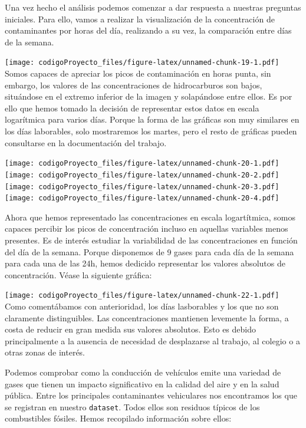 \documentclass[
]{article}
\begin{document}
Una vez hecho el análisis podemos comenzar a dar respuesta a nuestras
preguntas iniciales. Para ello, vamos a realizar la visualización de la
concentración de contaminantes por horas del día, realizando a su vez,
la comparación entre días de la semana.

\texttt{[image: codigoProyecto\_files/figure-latex/unnamed-chunk-19-1.pdf]}
Somos capaces de apreciar los picos de contaminación en horas punta, sin
embargo, los valores de las concentraciones de hidrocarburos son bajos,
situándose en el extremo inferior de la imagen y solapándose entre
ellos. Es por ello que hemos tomado la decisión de representar estos
datos en escala logarítmica para varios días. Porque la forma de las
gráficas son muy similares en los días laborables, solo mostraremos los
martes, pero el resto de gráficas pueden consultarse en la documentación
del trabajo.

\texttt{[image: codigoProyecto\_files/figure-latex/unnamed-chunk-20-1.pdf]}
\texttt{[image: codigoProyecto\_files/figure-latex/unnamed-chunk-20-2.pdf]}
\texttt{[image: codigoProyecto\_files/figure-latex/unnamed-chunk-20-3.pdf]}
\texttt{[image: codigoProyecto\_files/figure-latex/unnamed-chunk-20-4.pdf]}

Ahora que hemos representado las concentraciones en escala logartítmica,
somos capaces percibir los picos de concentración incluso en aquellas
variables menos presentes. Es de interés estudiar la variabilidad de las
concentraciones en función del día de la semana. Porque disponemos de 9
gases para cada día de la semana para cada una de las 24h, hemos
dedicido representar los valores absolutos de concentración. Véase la
siguiente gráfica:

\texttt{[image: codigoProyecto\_files/figure-latex/unnamed-chunk-22-1.pdf]}
Como comentábamos con anterioridad, los días lasborables y los que no
son claramente distinguibles. Las concentraciones mantienen levemente la
forma, a costa de reducir en gran medida sus valores absolutos. Esto es
debido principalmente a la ausencia de necesidad de desplazarse al
trabajo, al colegio o a otras zonas de interés.

Podemos comprobar como la conducción de vehículos emite una variedad de
gases que tienen un impacto significativo en la calidad del aire y en la
salud pública. Entre los principales contaminantes vehiculares nos
encontramos los que se registran en nuestro \texttt{dataset}. Todos
ellos son residuos típicos de los combustibles fósiles. Hemos recopilado
información sobre ellos:
\end{document}
